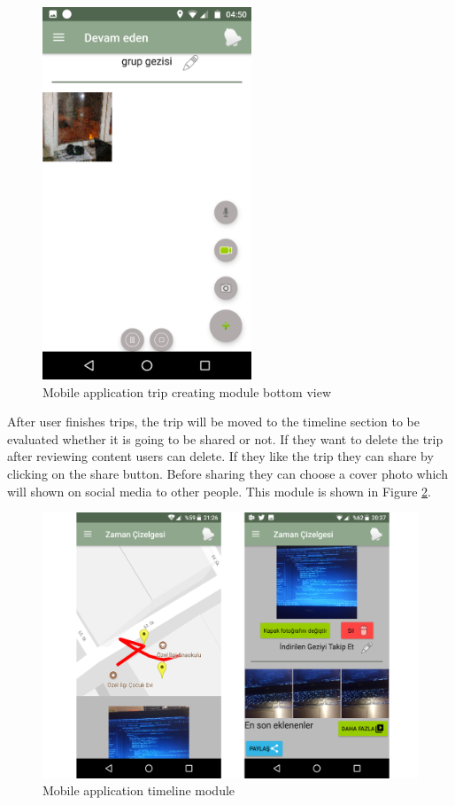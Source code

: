 \begin{figure}[!htbp]
\centering
\includegraphics[height=30em]{projectChapters/images/createdMedias.png}
\caption{Mobile application trip creating module bottom view}
\label{fig:createdMedias}
\end{figure}

\newpage

After user finishes trips, the trip will be moved to the timeline section to be evaluated whether it is going to be shared or not. If they want to delete the trip after reviewing content users can delete. If they like the trip they can share by clicking on the share button. Before sharing they can choose a cover photo which will shown on social media to other people. This module is shown in Figure \ref{fig:timeLine}.

\begin{figure}[!htbp]
\centering
\includegraphics[width=\textwidth]{projectChapters/images/timeLine.png}
\caption{Mobile application timeline module}
\label{fig:timeLine}
\end{figure}
 
